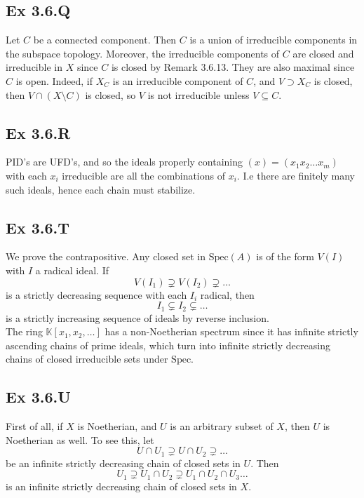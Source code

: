 \documentclass{article}
\theoremstyle{definition}
\newcommand{\K}{\mathbb{K}}
\newcommand{\Spec}{\text{Spec}}
\begin{document}
\subsection*{Ex 3.6.Q}

Let $C$ be a connected component. Then $C$ is a union of irreducible components
in the subspace topology. Moreover, the irreducible components of $C$ are
closed and irreducible in $X$ since $C$ is closed by Remark 3.6.13. They are
also maximal since $C$ is open. Indeed, if $X_C$ is an irreducible component of
$C$, and $V \supset X_C$ is closed, then $V \cap (X \setminus C)$ is closed, so
$V$ is not irreducible unless $V \subseteq C$.

\subsection*{Ex 3.6.R}

PID's are UFD's, and so the ideals properly containing $(x) = (x_1x_2\ldots
x_m)$ with each $x_i$ irreducible are all the combinations of $x_i$. I.e there
are finitely many such ideals, hence each chain must stabilize.

\subsection*{Ex 3.6.T}

We prove the contrapositive. Any closed set in $\Spec(A)$ is of the form $V(I)$
with $I$ a radical ideal. If 
\[
	V(I_1) \supsetneq V(I_2) \supsetneq \ldots
\] 
is a strictly decreasing sequence with each $I_i$ radical, then
\[
	I_1 \subsetneq I_2 \subsetneq \ldots
\]
is a strictly increasing sequence of ideals by reverse inclusion. \\

The ring $\K[x_1,x_2, \ldots]$ has a non-Noetherian spectrum since it has
infinite strictly ascending chains of prime ideals, which turn into infinite
strictly decreasing chains of closed irreducible sets under $\Spec$.

\subsection*{Ex 3.6.U}

First of all, if $X$ is Noetherian, and $U$ is an arbitrary subset of $X$, then
$U$ is Noetherian as well. To see this, let 
\[
	U \cap U_1 \supsetneq U \cap U_2 \supsetneq \ldots
\] 
be an infinite strictly decreasing chain of closed sets in $U$. Then
\[
	U_1 \supsetneq U_1 \cap U_2 \supsetneq U_1 \cap U_2 \cap U_3 \ldots
\] 
is an infinite strictly decreasing chain of closed sets in $X$. \\
\end{document}
